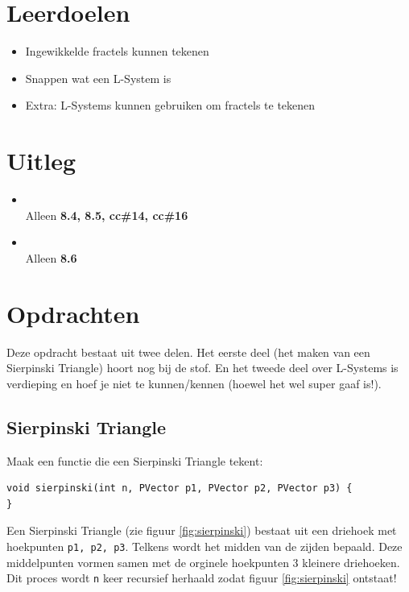 \documentclass{../qh_exercise}
\begin{document}
\section{Leerdoelen}
\begin{itemize}
    \item Ingewikkelde fractels kunnen tekenen
    \item Snappen wat een L-System is
    \item Extra: L-Systems kunnen gebruiken om fractels te tekenen
\end{itemize}

\section{Uitleg}
\begin{itemize}
    \item {}\\
    Alleen \textbf{8.4, 8.5, cc\#14, cc\#16}\\
    \item {}\\
    Alleen \textbf{8.6}\\
\end{itemize}

\newpage
\section{Opdrachten}
Deze opdracht bestaat uit twee delen. Het eerste deel (het maken van een Sierpinski Triangle) hoort nog bij de stof. En het tweede deel over L-Systems is verdieping en hoef je niet te kunnen/kennen (hoewel het wel super gaaf is!).

\subsection{Sierpinski Triangle}
Maak een functie die een Sierpinski Triangle tekent:
\begin{lstlisting}
void sierpinski(int n, PVector p1, PVector p2, PVector p3) {
}
\end{lstlisting}
Een Sierpinski Triangle (zie figuur \ref{fig:sierpinski}) bestaat uit een driehoek met hoekpunten \texttt{p1, p2, p3}. Telkens wordt het midden van de zijden bepaald. Deze middelpunten vormen samen met de orginele hoekpunten 3 kleinere driehoeken. Dit proces wordt \texttt{n} keer recursief herhaald zodat figuur \ref{fig:sierpinski} ontstaat!
\end{document}

